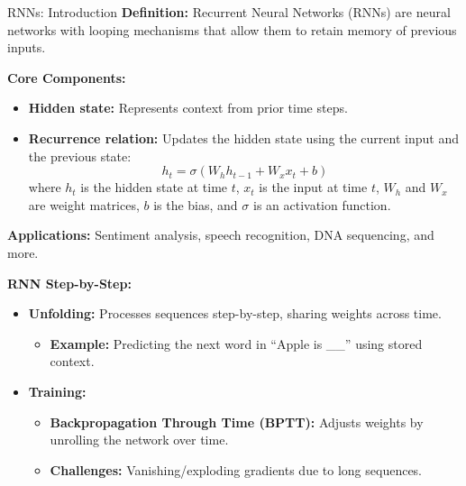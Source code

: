 \begin{frame}[allowframebreaks]{RNNs: Introduction}
    \textbf{Definition:} Recurrent Neural Networks (RNNs) are neural networks with looping mechanisms that allow them to retain memory of previous inputs.

    \vspace{0.5em}
    \textbf{Core Components:}
    \begin{itemize}
        \item \textbf{Hidden state:} Represents context from prior time steps.
        \item \textbf{Recurrence relation:} Updates the hidden state using the current input and the previous state:
        \[
            h_t = \sigma(W_h h_{t-1} + W_x x_t + b)
        \]
        where $h_t$ is the hidden state at time $t$, $x_t$ is the input at time $t$, $W_h$ and $W_x$ are weight matrices, $b$ is the bias, and $\sigma$ is an activation function.
    \end{itemize}

    \vspace{0.5em}
    \textbf{Applications:} Sentiment analysis, speech recognition, DNA sequencing, and more.

    \framebreak

    \textbf{RNN Step-by-Step:}
    \begin{itemize}
        \item \textbf{Unfolding:} Processes sequences step-by-step, sharing weights across time.
        \begin{itemize}
            \item \textbf{Example:} Predicting the next word in ``Apple is \_\_'' using stored context.
        \end{itemize}
        \item \textbf{Training:}
        \begin{itemize}
            \item \textbf{Backpropagation Through Time (BPTT):} Adjusts weights by unrolling the network over time.
            \item \textbf{Challenges:} Vanishing/exploding gradients due to long sequences.
        \end{itemize}
    \end{itemize}
\end{frame}